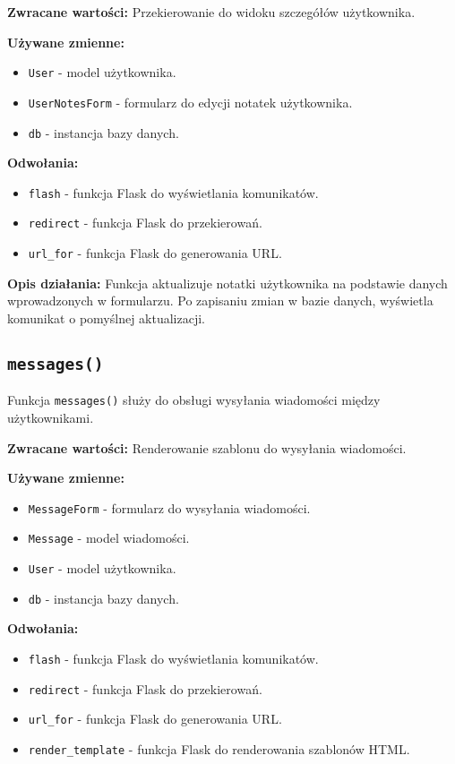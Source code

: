 \documentclass[12pt,a4paper]{report}
\begin{document}
\textbf{Zwracane wartości:} Przekierowanie do widoku szczegółów użytkownika.

\textbf{Używane zmienne:}
\begin{itemize}
    \item \texttt{User} - model użytkownika.
    \item \texttt{UserNotesForm} - formularz do edycji notatek użytkownika.
    \item \texttt{db} - instancja bazy danych.
\end{itemize}

\textbf{Odwołania:}
\begin{itemize}
    \item \texttt{flash} - funkcja Flask do wyświetlania komunikatów.
    \item \texttt{redirect} - funkcja Flask do przekierowań.
    \item \texttt{url\_for} - funkcja Flask do generowania URL.
\end{itemize}

\textbf{Opis działania:}
Funkcja aktualizuje notatki użytkownika na podstawie danych wprowadzonych w formularzu. Po zapisaniu zmian w bazie danych, wyświetla komunikat o pomyślnej aktualizacji.

\subsection{\texttt{messages()}}
\label{sec:messages}
Funkcja \texttt{messages()} służy do obsługi wysyłania wiadomości między użytkownikami.

\textbf{Zwracane wartości:} Renderowanie szablonu do wysyłania wiadomości.

\textbf{Używane zmienne:}
\begin{itemize}
    \item \texttt{MessageForm} - formularz do wysyłania wiadomości.
    \item \texttt{Message} - model wiadomości.
    \item \texttt{User} - model użytkownika.
    \item \texttt{db} - instancja bazy danych.
\end{itemize}

\textbf{Odwołania:}
\begin{itemize}
    \item \texttt{flash} - funkcja Flask do wyświetlania komunikatów.
    \item \texttt{redirect} - funkcja Flask do przekierowań.
    \item \texttt{url\_for} - funkcja Flask do generowania URL.
    \item \texttt{render\_template} - funkcja Flask do renderowania szablonów HTML.
\end{itemize}
\end{document}
